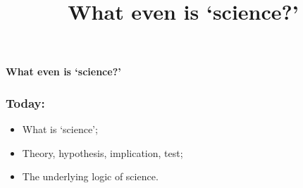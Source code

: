 \documentclass[aspectratio=169]{beamer}
\title{What even is `science?'}
\date{}
\theoremstyle{principle}
\begin{document}


{
  \begin{frame}[plain]
  
\begin{mdframed}[tikzsetting={draw=white,fill=white,fill opacity=0.6,draw opacity=0.4,
               line width=0pt},backgroundcolor=none,leftmargin=20,
               rightmargin=20,innertopmargin=4pt]
\begin{center}
\Huge \textbf{What even is `science?'}
\end{center}
\end{mdframed}

  \end{frame}
}

\begin{frame}
\frametitle{Today:}
\begin{itemize}
\item What is `science';
\bigskip
\bigskip
\bigskip
\item Theory, hypothesis, implication, test;
\bigskip
\bigskip
\bigskip
\item The underlying logic of science.
\end{itemize}

\end{frame}
\end{document}
